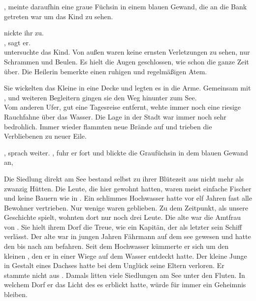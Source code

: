 \begin{Large}
, meinte daraufhin eine graue Füchsin in einem blauen Gewand, die an die Bank getreten war um das Kind zu sehen. 

{\Eno} nickte ihr zu.\\
, sagt er.\\
{\Salbana} untersuchte das Kind. Von außen waren keine ernsten Verletzungen zu sehen, nur Schrammen und Beulen. Es hielt die Augen geschlossen, wie schon die ganze Zeit über. Die Heilerin bemerkte einen ruhigen und regelmäßigen Atem.

Sie wickelten das Kleine in eine Decke und legten es {\Nox} in die Arme. Gemeinsam mit {\Salbana}, {\Eno} und weiteren Begleitern gingen sie den Weg hinunter zum See.\\
Vom anderen Ufer, gut eine Tagesreise entfernt, wehte immer noch eine riesige Rauchfahne über das Wasser. Die Lage in der Stadt {\Tern} war immer noch sehr bedrohlich.
Immer wieder flammten neue Brände auf und trieben die Verbliebenen zu neuer Eile.

, sprach {\Nox} weiter. , fuhr er fort und blickte die Graufüchsin in dem blauen Gewand an, 

Die Siedlung {\AltBerna} direkt am See bestand selbst zu ihrer Blütezeit aus nicht mehr als zwanzig Hütten. Die Leute, die hier gewohnt hatten, waren meist einfache Fischer und keine Bauern wie in {\Berna}. Ein schlimmes Hochwasser hatte vor elf Jahren fast alle Bewohner vertrieben. Nur wenige waren geblieben. Zu dem Zeitpunkt, als unsere Geschichte spielt, wohnten dort nur noch drei Leute. Die alte {\Tea} war die Amtfrau von {\AltBerna}. Sie hielt ihrem Dorf die Treue, wie ein Kapitän, der als letzter sein Schiff verlässt. Der alte {\Marn} war in jungen Jahren Fährmann auf dem {\Tern}see gewesen und hatte den {\Rhin} bis nach {\Toris} am {\Dreifluss} befahren. Seit dem Hochwasser kümmerte er sich um den kleinen {\Piedo}, den er in einer Wiege auf dem Wasser entdeckt hatte. Der kleine Junge in Gestalt eines Dachses hatte bei dem Unglück seine Eltern verloren. Er stammte nicht aus {\AltBerna}. Damals litten viele Siedlungen am See unter den Fluten. In welchem Dorf er das Licht des {\Enland}es erblickt hatte, würde für immer ein Geheimnis bleiben.


\end{Large}
